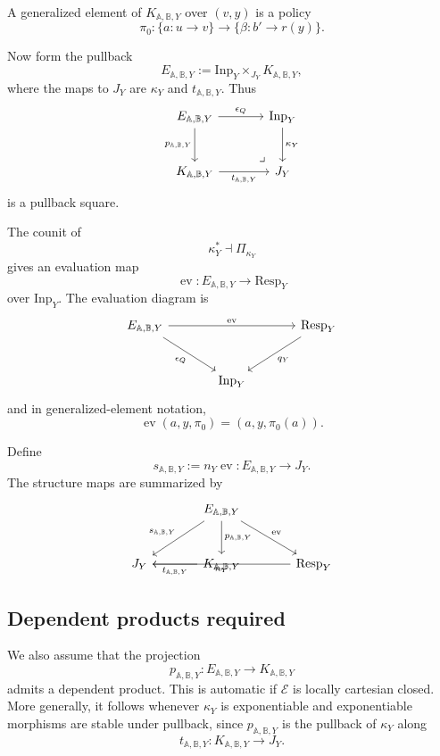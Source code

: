 A generalized element of \(K_{\mathbb A,\mathbb B,Y}\) over \((v,y)\) is a
policy
\[
\pi_0:
\{a:u\to v\}
\to
\{\beta:b'\to r(y)\}.
\]

Now form the pullback
\[
E_{\mathbb A,\mathbb B,Y}
:=
\mathrm{Inp}_Y\times_{J_Y}K_{\mathbb A,\mathbb B,Y},
\]
where the maps to \(J_Y\) are \(\kappa_Y\) and
\(t_{\mathbb A,\mathbb B,Y}\).  Thus
\[
\begin{tikzcd}[column sep=large,row sep=large]
E_{\mathbb A,\mathbb B,Y}
  \arrow[r,"\epsilon_Q"]
  \arrow[d,"p_{\mathbb A,\mathbb B,Y}"']
&
\mathrm{Inp}_Y
  \arrow[d,"\kappa_Y"]
\\
K_{\mathbb A,\mathbb B,Y}
  \arrow[r,"t_{\mathbb A,\mathbb B,Y}"']
&
J_Y
\arrow[ul,phantom,very near start,"\lrcorner"]
\end{tikzcd}
\]
is a pullback square.

The counit of
\[
\kappa_Y^\ast\dashv\Pi_{\kappa_Y}
\]
gives an evaluation map
\[
\operatorname{ev}:
E_{\mathbb A,\mathbb B,Y}\to \mathrm{Resp}_Y
\]
over \(\mathrm{Inp}_Y\).  The evaluation diagram is
\[
\begin{tikzcd}[column sep=large,row sep=large]
E_{\mathbb A,\mathbb B,Y}
  \arrow[rr,"\operatorname{ev}"]
  \arrow[dr,"\epsilon_Q"']
&&
\mathrm{Resp}_Y
  \arrow[dl,"q_Y"]
\\
&
\mathrm{Inp}_Y
&
\end{tikzcd}
\]
and in generalized-element notation,
\[
\operatorname{ev}(a,y,\pi_0)=(a,y,\pi_0(a)).
\]

Define
\[
s_{\mathbb A,\mathbb B,Y}
:=
n_Y\operatorname{ev}:
E_{\mathbb A,\mathbb B,Y}\to J_Y.
\]
The structure maps are summarized by
\[
\begin{tikzcd}[column sep=large,row sep=large]
&
E_{\mathbb A,\mathbb B,Y}
  \arrow[dl,"s_{\mathbb A,\mathbb B,Y}"']
  \arrow[d,"p_{\mathbb A,\mathbb B,Y}"]
  \arrow[dr,"\operatorname{ev}"]
&
\\
J_Y
&
K_{\mathbb A,\mathbb B,Y}
  \arrow[l,"t_{\mathbb A,\mathbb B,Y}"]
&
\mathrm{Resp}_Y
  \arrow[ll,"n_Y"]
\end{tikzcd}
\]

\subsection{Dependent products required}
\label{subsec:poly-relative-dependent-products-required}

We also assume that the projection
\[
p_{\mathbb A,\mathbb B,Y}:
E_{\mathbb A,\mathbb B,Y}\to K_{\mathbb A,\mathbb B,Y}
\]
admits a dependent product.  This is automatic if \(\mathcal E\) is locally
cartesian closed.  More generally, it follows whenever \(\kappa_Y\) is
exponentiable and exponentiable morphisms are stable under pullback, since
\(p_{\mathbb A,\mathbb B,Y}\) is the pullback of \(\kappa_Y\) along
\[
t_{\mathbb A,\mathbb B,Y}:K_{\mathbb A,\mathbb B,Y}\to J_Y.
\]

